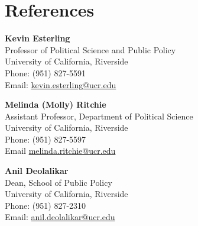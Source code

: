 \documentclass[letterpaper,11pt]{article}
\newcommand{\ucr}{University of California, Riverside}
\begin{document}
\vspace{.25cm}


\section{References}

\textbf{Kevin Esterling} \\
Professor of Political Science and Public Policy \\
\ucr \\
Phone: (951) 827-5591 \\
Email: \href{mailto:kevin.esterling@ucr.edu}{kevin.esterling@ucr.edu}

\bigskip

\textbf{Melinda (Molly) Ritchie} \\
Assistant Professor, Department of Political Science \\
\ucr \\
Phone: (951) 827-5597 \\
Email \href{mailto:melinda.ritchie@ucr.edu}{melinda.ritchie@ucr.edu} 

\bigskip

\textbf{Anil Deolalikar} \\
Dean, School of Public Policy \\
\ucr \\
Phone: (951) 827-2310 \\
Email: \href{mailto:anil.deolalikar@ucr.edu}{anil.deolalikar@ucr.edu}
\end{document}
